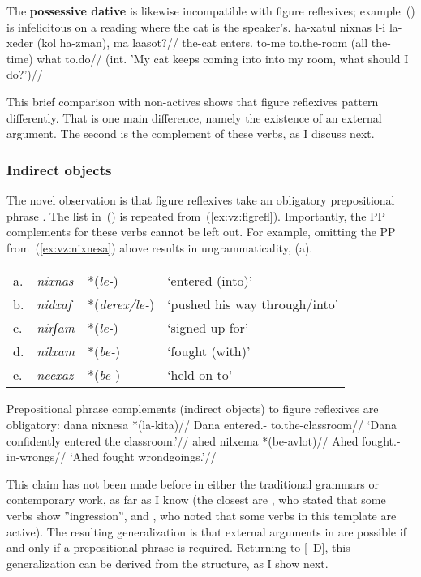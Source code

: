{The \textbf{possessive dative} is likewise incompatible with figure reflexives; example~(\nextx) is infelicitous on a reading where the cat is the speaker's.
\ex \begingl
	\gla\ljudge{\#}ha-xatul nixnas l-i la-xeder (kol ha-zman), ma laasot?//
	\glb the-cat enters. to-me to.the-room (all the-time) what to.do//
	\glft (int. 'My cat keeps coming into into my room, what should I do?')//
	\endgl
\xe

This brief comparison with non-actives shows that figure reflexives pattern differently. That is one main difference, namely the existence of an external argument. The second is the complement of these verbs, as I discuss next.

	\subsubsection{Indirect objects} \label{vz:tnif:figrefl:pp}
The novel observation is that figure reflexives take an obligatory prepositional phrase \citep{kastner16phd,ahdoutkastner18}. The list in~(\nextx) is repeated from~(\ref{ex:vz:figrefl}). Importantly, the PP complements for these verbs cannot be left out. For example, omitting the PP from~(\ref{ex:vz:nixnesa}) above results in ungrammaticality, (\anextx a).
\ex \begin{tabular}{l>{\em}lll}
	a.& nixnas &  *(\emph{le-}) & `entered (into)'\\
	b.& nidxaf & *(\emph{derex/le-})  & `pushed his way through/into' \\
	c.& nirʃam & *(\emph{le-})  & `signed up for' \\
	d.& nilxam & *(\emph{be-}) & `fought (with)' \\
	e.& neexaz & *(\emph{be-}) & `held on to' \\
    \end{tabular}
\xe

\pex Prepositional phrase complements (indirect objects) to figure reflexives are obligatory:
	\a \begingl
		\gla dana nixnesa *(la-kita)//
		\glb Dana entered.- to.the-classroom//
		\glft `Dana confidently entered the classroom.'//
	\endgl
	\a \begingl
		\gla ahed nilxema *(be-avlot)//
		\glb Ahed fought.- in-wrongs//
		\glft `Ahed fought wrondgoings.'//
	\endgl
\xe

This claim has not been made before in either the traditional grammars or contemporary work, as far as I know (the closest are \citealt[87]{berman78}, who stated that some verbs show ''ingression'', and \citealt{schwarzwald08}, who noted that some verbs in this template are active). The resulting generalization is that external arguments in {\tnif} are possible if and only if a prepositional phrase is required. Returning to [--D], this generalization can be derived from the structure, as I show next.

}
